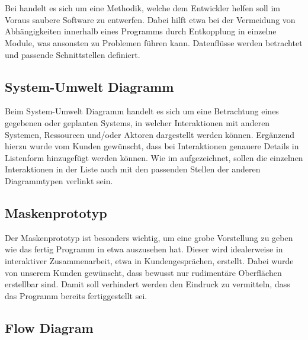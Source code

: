 
\section{\textFlowDesign}

Bei \textFlowDesign{} handelt es sich um eine Methodik, welche dem Entwickler helfen soll
im Voraus saubere Software zu entwerfen. Dabei hilft \textFlowDesign{} etwa bei der
Vermeidung von Abhängigkeiten innerhalb eines Programms durch Entkopplung in einzelne
Module, was ansonsten zu Problemen führen kann.
Datenflüsse werden betrachtet und passende Schnittstellen definiert.

\subsection{System-Umwelt Diagramm}
Beim System-Umwelt Diagramm handelt es sich um eine Betrachtung eines gegebenen oder geplanten Systems, in welcher Interaktionen mit anderen Systemen, Ressourcen und/oder Aktoren dargestellt werden können. Ergänzend hierzu wurde vom Kunden gewünscht, dass bei Interaktionen genauere Details in Listenform hinzugefügt werden können.
Wie im  aufgezeichnet, sollen die einzelnen Interaktionen in der Liste auch mit den passenden Stellen der anderen Diagrammtypen verlinkt sein.


\subsection{Maskenprototyp}
Der Maskenprototyp ist besonders wichtig, um eine grobe Vorstellung zu geben wie das fertig Programm in etwa auszusehen hat. Dieser wird idealerweise in interaktiver Zusammenarbeit, etwa in Kundengesprächen, erstellt. Dabei wurde von unserem Kunden gewünscht, dass bewusst nur rudimentäre Oberflächen erstellbar sind. Damit soll verhindert werden den Eindruck zu vermitteln, dass das Programm bereits fertiggestellt sei.

\subsection{Flow Diagram}
